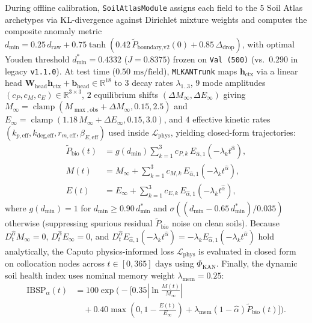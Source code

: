 \documentclass[10pt,twocolumn,a4paper]{article}
\begin{document}
During offline calibration, \texttt{SoilAtlasModule} assigns each field to the 5 Soil Atlas archetypes via KL-divergence against Dirichlet mixture weights and computes the composite anomaly metric $d_{\min} = 0.25\,d_{\text{raw}} + 0.75\tanh(0.42\,\tilde{P}_{\text{boundary,v2}}(0) + 0.85\,\Delta_{\text{drop}})$, with optimal Youden threshold $d_{\min}^* = 0.4332$ ($J = 0.8375$) frozen on \texttt{Val (500)} (vs.\ $0.290$ in legacy \texttt{v1.1.0}). At test time ($0.50\text{ ms/field}$), \texttt{MLKANTrunk} maps $\mathbf{h}_{\text{ctx}}$ via a linear head $\mathbf{W}_{\text{head}}\mathbf{h}_{\text{ctx}} + \mathbf{b}_{\text{head}} \in \mathbb{R}^{18}$ to $3$ decay rates $\lambda_{1..3}$, $9$ mode amplitudes $(c_P, c_M, c_E) \in \mathbb{R}^{3\times 3}$, $2$ equilibrium shifts $(\Delta M_\infty, \Delta E_\infty)$ giving $M_\infty = \operatorname{clamp}(M_{\max,\text{obs}} + \Delta M_\infty, 0.15, 2.5)$ and $E_\infty = \operatorname{clamp}(1.18\,M_\infty + \Delta E_\infty, 0.15, 3.0)$, and $4$ effective kinetic rates $(k_{p,\text{eff}}, k_{\text{deg,eff}}, r_{m,\text{eff}}, \beta_{E,\text{eff}})$ used inside $\mathcal{L}_{\text{phys}}$, yielding closed-form trajectories:
\begin{align}
  \tilde{P}_{\text{bio}}(t) &= g(d_{\min})\sum_{k=1}^3 c_{P,k}\,E_{\hat{\alpha},1}\!\left(-\lambda_k t^{\hat{\alpha}}\right), \label{eq:p_exp} \\
  M(t) &= M_\infty + \sum_{k=1}^3 c_{M,k}\,E_{\hat{\alpha},1}\!\left(-\lambda_k t^{\hat{\alpha}}\right), \label{eq:m_exp} \\
  E(t) &= E_\infty + \sum_{k=1}^3 c_{E,k}\,E_{\hat{\alpha},1}\!\left(-\lambda_k t^{\hat{\alpha}}\right), \label{eq:e_exp}
\end{align}
where $g(d_{\min}) = 1$ for $d_{\min} \ge 0.90\,d_{\min}^*$ and $\sigma((d_{\min} - 0.65\,d_{\min}^*)/0.035)$ otherwise (suppressing spurious residual $\tilde{P}_{\text{bio}}$ noise on clean soils). Because $D_t^{\hat{\alpha}} M_\infty = 0$, $D_t^{\hat{\alpha}} E_\infty = 0$, and $D_t^{\hat{\alpha}} E_{\hat{\alpha},1}(-\lambda_k t^{\hat{\alpha}}) = -\lambda_k E_{\hat{\alpha},1}(-\lambda_k t^{\hat{\alpha}})$ hold analytically, the Caputo physics-informed loss $\mathcal{L}_{\text{phys}}$ is evaluated in closed form on collocation nodes across $t \in [0, 365]\text{ days}$ using $\Phi_{\text{KAN}}$. Finally, the dynamic soil health index uses nominal memory weight $\lambda_{\text{mem}} = 0.25$:
\begin{equation}
  \begin{aligned}
    \text{IBSP}_\alpha(t) &= 100\exp\!\Biggl(-\biggl[0.35\left|\ln\frac{M(t)}{M_\infty}\right| \\
    &\quad + 0.40\max\!\left(0, 1 - \frac{E(t)}{E_\infty}\right) + \lambda_{\text{mem}}(1-\hat{\alpha})\tilde{P}_{\text{bio}}(t)\biggr]\Biggr).
  \end{aligned} \label{eq:ibsp}
\end{equation}
\end{document}
